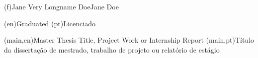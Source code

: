 %
 \ncauthorname(f){Jane Very Longname Doe}{Jane Doe}



\ncauthordegree(en){Graduated} 
\ncauthordegree(pt){Licenciado}

\nctitle(main,en){Master Thesis Title, Project Work or Internship Report}
\nctitle(main,pt){Título da dissertação de mestrado, trabalho de projeto ou relatório de estágio}


